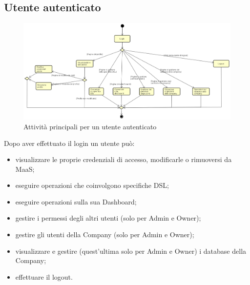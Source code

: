 \subsection{Utente autenticato}
\begin{figure}[H]
\begin{center}
\includegraphics[width=18cm,angle=90]{res/sections/backend/activities/principaliConAuth.png}
\caption{Attività principali per un utente autenticato}
\end{center}
\end{figure}
Dopo aver effettuato il login un utente può:
\begin{itemize}
\item visualizzare le proprie credenziali di accesso, modificarle o rimuoversi da MaaS;
\item eseguire operazioni che coinvolgono specifiche DSL;
\item eseguire operazioni sulla sua Dashboard;
\item gestire i permessi degli altri utenti (solo per Admin e Owner);
\item gestire gli utenti della Company (solo per Admin e Owner);
\item visualizzare e gestire (quest'ultima solo per Admin e Owner) i database della Company;
\item effettuare il logout.
\end{itemize}

